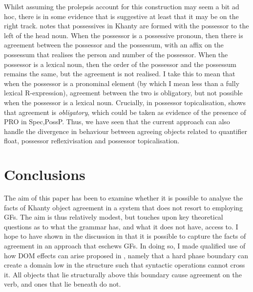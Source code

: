\documentclass[output=paper
,modfonts
,nonflat]{langsci/langscibook}
\begin{document}
Whilst assuming the prolepsis account for this construction may seem a bit ad hoc, there is in some evidence that is suggestive at least that it may be on the right track. 
\citet[][345]{nikolaeva1999} notes that possessives in Khanty are formed with the possessor to the left of the head noun. 
When the possessor is a possessive pronoun, then there is agreement between the possessor and the possessum, with an affix on the possessum that realises the person and number of the possessor.
When the possessor is a lexical noun, then the order of the possessor and the possessum remains the same, but the agreement is not realised.
I take this to mean that when the possessor is a pronominal element (by which I mean less than a fully lexical R-expression), agreement between the two is obligatory, but not possible when the possessor is a lexical noun. Crucially, in possessor topicalisation, \citeauthor{nikolaeva1999} shows that agreement is \textit{obligatory}, which could be taken as evidence of the presence of PRO in Spec,PossP.  
Thus, we have seen that the current approach can also handle the divergence in behaviour between agreeing objects related to quantifier float, possessor reflexivisation and possessor topicalisation.

\ea 
\begin{multicols}{2}
	\z
\end{multicols}
\z

\section{Conclusions}\label{conclusion}

The aim of this paper has been to examine whether it is possible to analyse the facts of Khanty object agreement in a system that does not resort to employing GFs. 
The aim is thus relatively modest, but touches upon key theoretical questions as to what the grammar has, and what it does not have, access to.
I hope to have shown in the discussion in  that it is possible to capture the facts of agreement in an approach that eschews GFs. 
In doing so, I made qualified use of how DOM effects can arise proposed in \citet{Baker2015}, namely that a hard phase boundary can create a domain low in the structure such that syntactic operations cannot cross it.
All objects that lie structurally above this boundary cause agreement on the verb, and ones that lie beneath do not.
\end{document}
